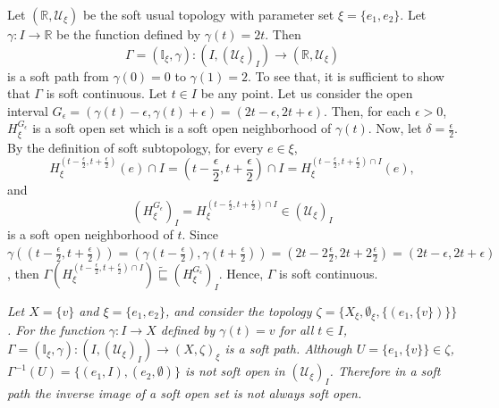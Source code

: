 \documentclass[preprint,12pt]{elsarticle}
\begin{document}
\begin{ex}\label{exam4.3}\em{
Let $(\mathbb{R},\mathscr{U}_\xi)$ be the soft usual topology with parameter set  $\xi = \{e_1, e_2\}$. Let $\gamma \colon I \to \mathbb{R}$ be the function defined by $\gamma(t)=2t $. Then \[
\Gamma =(\mathbb{I}_\xi,\gamma) \colon (I,(\mathscr{U}_{\xi})_{I})\to(\mathbb{R},\mathscr{U}_\xi)\] is a soft path from $\gamma(0) = 0 $ to $\gamma(1) = 2 $. To see that, it is sufficient to show that $\Gamma$ is soft continuous. Let $t\in I$ be any point. Let us consider the open interval $G_\epsilon=(\gamma(t)-\epsilon,\gamma(t)+\epsilon)=(2t-\epsilon,2t+\epsilon)$. Then, for each $\epsilon>0$, $H^{G_\epsilon}_\xi$ is a soft open set which is a soft open neighborhood of $\gamma(t)$. Now, let $\delta= \frac{\epsilon}{2}$. By the definition of soft subtopology, for every $e\in \xi$, $$H^{(t-\frac{\epsilon}{2},t+\frac{\epsilon}{2})}_\xi(e)\cap I=(t-\frac{\epsilon}{2},t+\frac{\epsilon}{2})\cap I =H^{(t-\frac{\epsilon}{2},t+\frac{\epsilon}{2})\cap I}_\xi(e),$$ and  $$(H^{G_\epsilon}_\xi)_I=H^{(t-\frac{\epsilon}{2},t+\frac{\epsilon}{2})\cap I}_\xi\in (\mathcal{U}_{\xi})_{I}$$  is a soft open neighborhood of $t$. Since $\gamma((t-\frac{\epsilon}{2},t+\frac{\epsilon}{2}))=(\gamma (t-\frac{\epsilon}{2}),\gamma (t+\frac{\epsilon}{2}))=(2t-2\frac{\epsilon}{2},2t+2\frac{\epsilon}{2})=(2t-\epsilon,2t+\epsilon)$, then     $\Gamma (H^{(t-\frac{\epsilon}{2},t+\frac{\epsilon}{2})\cap I}_\xi)\widetilde{\sqsubseteq}(H^{G_\epsilon}_\xi)_I$. Hence, $\Gamma$ is soft continuous.


}
\end{ex}
\begin{ex}\em{
 Let $X = \{v\}$ and $\xi = \{e_1,e_2\}$, and consider the topology $\zeta=\{X_\xi,\emptyset_\xi,\{(e_1,\{v\})\}\}$.
For the function $\gamma:I \to X$ defined by $\gamma(t)=v$ for all $t\in            I $, $\Gamma =(\mathbb{I}_\xi ,\gamma) \colon (I,(\mathscr{U}_{\xi})_{I})\to  (X,\zeta)_\xi$ is a soft path.
Although $U=\{e_1,\{v\}\} \in \zeta$, $\Gamma^{-1}(U)=\{(e_1,I),(e_2,\emptyset)\}$ is not soft open in $(\mathcal{U}_{\xi})_{I}$. Therefore
in a soft path the inverse image of a soft open set is not always soft open.}
\end{ex}
\end{document}
